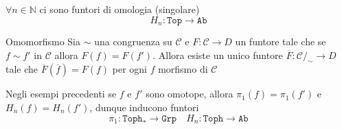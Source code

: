 \begin{example}{}
    \(\forall n \in \mathbb{N}\) ci sono funtori di omologia (singolare)
    \[
      H_{n} : \mathtt{Top} \to \mathtt{Ab}
    \]
\end{example}
\begin{theorem}{Omomorfismo}
    Sia \(\sim \) una congruenza su \(\mathcal{C}\) e \(F : \mathcal{C} \to D\) un funtore tale che
    se \(f \sim f'\) in \(\mathcal{C}\) allora \(F{(f)} = F{(f')}\).
    Allora esiste un unico funtore \(\overline{F} : \mathcal{C} /_\sim \to D\) tale
    che \(\overline{F}{(\overline{f})} = F{(f)}\) per ogni \(f\) morfismo di \(\mathcal{C}\) 
\end{theorem}
\begin{example}{}
    Negli esempi precedenti se \(f\) e \(f'\) sono omotope, allora \(\pi_{1}{(f)} = \pi_{1}{(f')}\) e \(H_{n}{(f)} = H_{n}{(f')}\), dunque inducono funtori
    \[
      \pi_{1} : \mathtt{Toph}_* \to \mathtt{Grp} \quad H_{n} : \mathtt{Toph} \to \mathtt{Ab}
    \]
\end{example}

